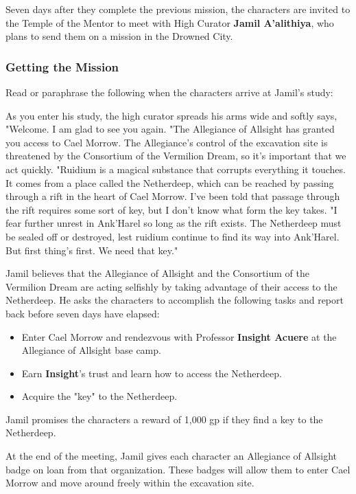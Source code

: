 \documentclass[letterpaper, 11pt, bg=full, twocolumn]{dndbook}
\begin{document}
Seven days after they complete the previous mission, the characters are invited to the Temple of the Mentor to meet with High Curator \textbf{Jamil A'alithiya}, who plans to send them on a mission in the Drowned City.

\subsubsection{Getting the Mission}

Read or paraphrase the following when the characters arrive at Jamil's study:

\begin{DndReadAloud}
As you enter his study, the high curator spreads his arms wide and softly says, "Welcome. I am glad to see you again.
"The Allegiance of Allsight has granted you access to Cael Morrow. The Allegiance's control of the excavation site is threatened by the Consortium of the Vermilion Dream, so it's important that we act quickly.
"Ruidium is a magical substance that corrupts everything it touches. It comes from a place called the Netherdeep, which can be reached by passing through a rift in the heart of Cael Morrow. I've been told that passage through the rift requires some sort of key, but I don't know what form the key takes.
"I fear further unrest in Ank'Harel so long as the rift exists. The Netherdeep must be sealed off or destroyed, lest ruidium continue to find its way into Ank'Harel. But first thing's first. We need that key."
\end{DndReadAloud}

Jamil believes that the Allegiance of Allsight and the Consortium of the Vermilion Dream are acting selfishly by taking advantage of their access to the Netherdeep. He asks the characters to accomplish the following tasks and report back before seven days have elapsed:

\begin{itemize}
\item Enter Cael Morrow and rendezvous with Professor \textbf{Insight Acuere} at the Allegiance of Allsight base camp.
\item Earn \textbf{Insight}'s trust and learn how to access the Netherdeep.
\item Acquire the "key" to the Netherdeep.
\end{itemize}

Jamil promises the characters a reward of 1,000 gp if they find a key to the Netherdeep.

At the end of the meeting, Jamil gives each character an Allegiance of Allsight badge on loan from that organization. These badges will allow them to enter Cael Morrow and move around freely within the excavation site.
\end{document}

